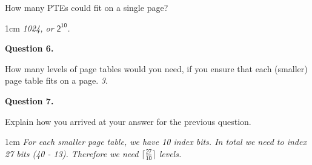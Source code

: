 \documentclass[12pt]{article}
\newenvironment{answer}{\begin{adjustwidth}{1cm}{}\itshape}{\end{adjustwidth}}
\begin{document}
How many PTEs could fit on a single page?

\vspace{1em}

\begin{answer}
  1024, or $\mathsf{2^{10}}$.
\end{answer}

\vspace{1em}

\textbf{Question 6.}

\vspace{1em}

How many levels of page tables would you need, if you ensure that each (smaller)
page table fits on a page. \textit{3}.

\vspace{1em}

\textbf{Question 7.}

\vspace{1em}

Explain how you arrived at your answer for the previous question.

\vspace{1em}

\begin{answer}
  For each smaller page table, we have 10 index bits. In total we need to index
  27 bits (40 - 13). Therefore we need $\mathsf{\lceil \frac{27}{10} \rceil}$
  levels.
\end{answer}
\end{document}
